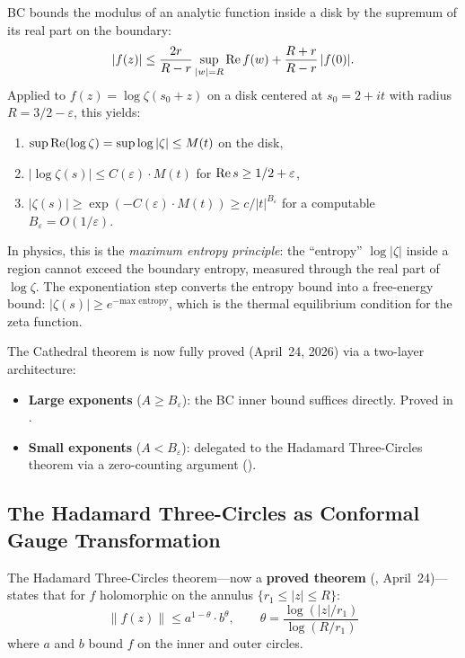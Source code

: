 \documentclass[11pt,a4paper]{article}
\begin{document}
\begin{principle}
BC bounds the modulus of an analytic function inside a disk by the
supremum of its real part on the boundary:
\[
  |f(z)| \leq \frac{2r}{R - r}\sup_{|w| = R} \operatorname{Re} f(w)
  + \frac{R + r}{R - r}\,|f(0)|.
\]
Applied to $f(z) = \log\zeta(s_0 + z)$ on a disk centered at $s_0 = 2 + it$
with radius $R = 3/2 - \varepsilon$, this yields:
\begin{enumerate}
  \item $\sup \operatorname{Re}(\log\zeta) = \sup \log|\zeta| \leq M(t)$ on the disk,
  \item $|\log\zeta(s)| \leq C(\varepsilon) \cdot M(t)$ for
    $\operatorname{Re} s \geq 1/2 + \varepsilon$,
  \item $|\zeta(s)| \geq \exp(-C(\varepsilon) \cdot M(t))
    \geq c/|t|^{B_\varepsilon}$ for a computable $B_\varepsilon = O(1/\varepsilon)$.
\end{enumerate}

In physics, this is the \emph{maximum entropy principle}: the
``entropy'' $\log|\zeta|$ inside a region cannot exceed the
boundary entropy, measured through the real part of $\log\zeta$.
The exponentiation step converts the entropy bound into a
free-energy bound: $|\zeta(s)| \geq e^{-\text{max entropy}}$,
which is the thermal equilibrium condition for the zeta function.

The Cathedral theorem  is now
fully proved (April~24, 2026) via a two-layer architecture:
\begin{itemize}
  \item \textbf{Large exponents} ($A \geq B_\varepsilon$): the BC inner bound
    suffices directly. Proved in .
  \item \textbf{Small exponents} ($A < B_\varepsilon$): delegated to the
    Hadamard Three-Circles theorem via a zero-counting argument
    ().
\end{itemize}
\end{principle}

\subsection{The Hadamard Three-Circles as Conformal Gauge Transformation}

The Hadamard Three-Circles theorem---now a \textbf{proved theorem}
(, April~24)---states that for $f$
holomorphic on the annulus $\{r_1 \leq |z| \leq R\}$:
\[
  \|f(z)\| \leq a^{1-\theta} \cdot b^\theta,
  \qquad \theta = \frac{\log(|z|/r_1)}{\log(R/r_1)}
\]
where $a$ and $b$ bound $f$ on the inner and outer circles.
\end{document}
